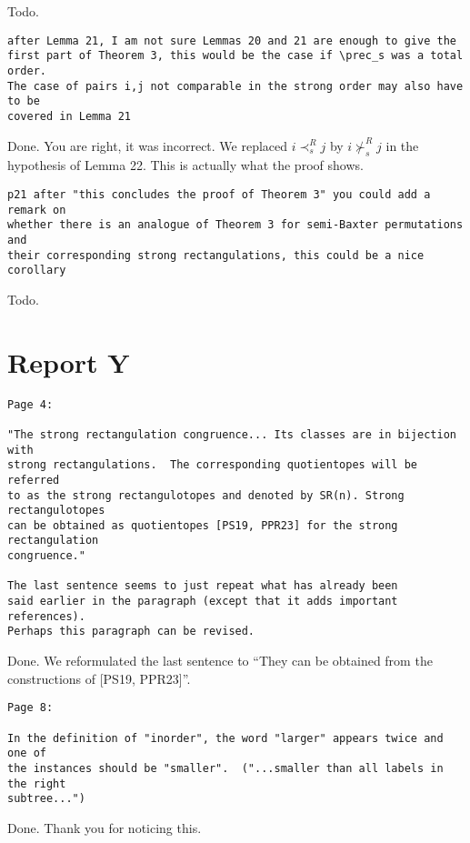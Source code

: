 \documentclass{article}
\begin{document}
Todo.

\begin{verbatim}
after Lemma 21, I am not sure Lemmas 20 and 21 are enough to give the 
first part of Theorem 3, this would be the case if \prec_s was a total order. 
The case of pairs i,j not comparable in the strong order may also have to be 
covered in Lemma 21
\end{verbatim}

Done. You are right, it was incorrect. We replaced $i \prec_s^R j$ by $i \not\succ_s^R j$ in the hypothesis of Lemma 22. This is actually what the proof shows.

\begin{verbatim}
p21 after "this concludes the proof of Theorem 3" you could add a remark on 
whether there is an analogue of Theorem 3 for semi-Baxter permutations and 
their corresponding strong rectangulations, this could be a nice corollary
\end{verbatim}

Todo.

\section{Report Y}

\begin{verbatim}
Page 4:

"The strong rectangulation congruence... Its classes are in bijection with 
strong rectangulations.  The corresponding quotientopes will be referred 
to as the strong rectangulotopes and denoted by SR(n). Strong rectangulotopes 
can be obtained as quotientopes [PS19, PPR23] for the strong rectangulation 
congruence." 

The last sentence seems to just repeat what has already been 
said earlier in the paragraph (except that it adds important references).  
Perhaps this paragraph can be revised.
\end{verbatim}

Done. We reformulated the last sentence to ``They can be obtained from the constructions of [PS19, PPR23]''.

\begin{verbatim}
Page 8:

In the definition of "inorder", the word "larger" appears twice and one of 
the instances should be "smaller".  ("...smaller than all labels in the right 
subtree...")
\end{verbatim}

Done. Thank you for noticing this.
\end{document}
